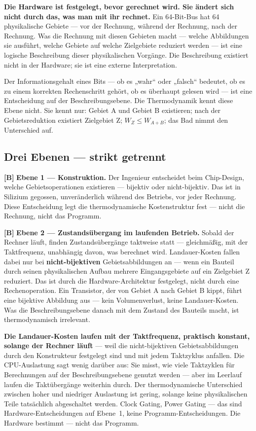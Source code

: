 \textbf{Die Hardware ist festgelegt, bevor gerechnet wird. Sie ändert sich nicht
durch das, was man mit ihr rechnet.} Ein 64-Bit-Bus hat 64 physikalische Gebiete
--- vor der Rechnung, während der Rechnung, nach der Rechnung. Was die Rechnung
mit diesen Gebieten macht --- welche Abbildungen sie ausführt, welche Gebiete auf
welche Zielgebiete reduziert werden --- ist eine logische Beschreibung dieser
physikalischen Vorgänge. Die Beschreibung existiert nicht in der Hardware; sie ist
eine externe Interpretation.

Der Informationsgehalt eines Bits --- ob es „wahr“ oder „falsch“ bedeutet, ob es
zu einem korrekten Rechenschritt gehört, ob es überhaupt gelesen wird --- ist eine
Entscheidung auf der Beschreibungsebene. Die Thermodynamik kennt diese Ebene
nicht. Sie kennt nur: Gebiet A und Gebiet B existieren; nach der Gebietsreduktion
existiert Zielgebiet Z; $W_Z \le W_{A+B}$; das Bad nimmt den Unterschied auf.

\subsection{Drei Ebenen --- strikt getrennt}

\textbf{[B]} \textbf{Ebene 1 --- Konstruktion.} Der Ingenieur entscheidet beim Chip-Design,
welche Gebietsoperationen existieren --- bijektiv oder nicht-bijektiv. Das ist in
Silizium gegossen, unveränderlich während des Betriebs, vor jeder Rechnung. Diese
Entscheidung legt die thermodynamische Kostenstruktur fest --- nicht die Rechnung,
nicht das Programm.

\textbf{[B]} \textbf{Ebene 2 --- Zustandsübergang im laufenden Betrieb.} Sobald der Rechner
läuft, finden Zustandsübergänge taktweise statt --- gleichmäßig, mit der
Taktfrequenz, unabhängig davon, was berechnet wird. Landauer-Kosten fallen dabei
nur bei \textbf{nicht-bijektiven} Gebietsabbildungen an --- wenn ein Bauteil durch
seinen physikalischen Aufbau mehrere Eingangsgebiete auf ein Zielgebiet Z
reduziert. Das ist durch die Hardware-Architektur festgelegt, nicht durch eine
Rechenoperation. Ein Transistor, der von Gebiet A nach Gebiet B kippt, führt eine
bijektive Abbildung aus --- kein Volumenverlust, keine Landauer-Kosten. Was die
Beschreibungsebene danach mit dem Zustand des Bauteils macht, ist thermodynamisch
irrelevant.

\textbf{Die Landauer-Kosten laufen mit der Taktfrequenz, praktisch konstant,
solange der Rechner läuft} --- weil die nicht-bijektiven Gebietsabbildungen durch
den Konstrukteur festgelegt sind und mit jedem Taktzyklus anfallen. Die
CPU-Auslastung sagt wenig darüber aus: Sie misst, wie viele Taktzyklen für
Berechnungen auf der Beschreibungsebene genutzt werden --- aber im Leerlauf laufen
die Taktübergänge weiterhin durch. Der thermodynamische Unterschied zwischen hoher
und niedriger Auslastung ist gering, solange keine physikalischen Teile
tatsächlich abgeschaltet werden. Clock Gating, Power Gating --- das sind
Hardware-Entscheidungen auf Ebene~1, keine Programm-Entscheidungen. Die Hardware
bestimmt --- nicht das Programm.

